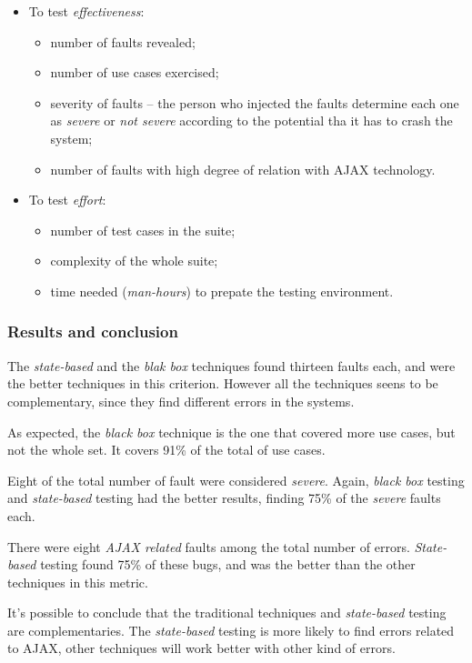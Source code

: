 \documentclass[a4paper]{article}
\begin{document}
\begin{itemize}

\item To test \emph{effectiveness}:
\begin{itemize}
\item number of faults revealed;
\item number of use cases exercised;
\item severity of faults -- the person who injected the faults determine each one as \emph{severe} or \emph{not severe} according to the potential tha it has to crash the system;
\item number of faults with high degree of relation with AJAX technology.
\end{itemize}

\item To test \emph{effort}:
\begin{itemize}
\item number of test cases in the suite;
\item complexity of the whole suite;
\item time needed (\emph{man-hours}) to prepate the testing environment.
\end{itemize}

\end{itemize} 

\subsubsection{Results and conclusion}

The \emph{state-based} and the \emph{blak box} techniques found thirteen faults each, and were the better techniques in this criterion.
However all the techniques seens to be complementary, since they find different errors in the systems.

As expected, the \emph{black box} technique is the one that covered more use cases, but not the whole set.
It covers 91\% of the total of use cases.

Eight of the total number of fault were considered \emph{severe}. Again, \emph{black box} testing and \emph{state-based} testing had the better results, finding 75\% of the \emph{severe} faults each.

There were eight \emph{AJAX related} faults among the total number of errors. 
\emph{State-based} testing found 75\% of these bugs, and was the better than the other techniques in this metric.

It's possible to conclude that the traditional techniques and \emph{state-based} testing are complementaries.
The \emph{state-based} testing is more likely to find errors related to AJAX, other techniques will work better with other kind of errors.
\end{document}
